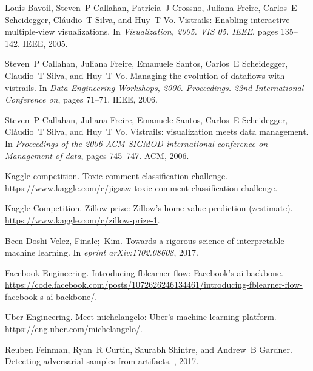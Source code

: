 \documentclass[11pt]{article}
\begin{document}
\begin{thebibliography}{10} 
\itemsep=1pt 
\begin{small}
Louis Bavoil, Steven~P Callahan, Patricia~J Crossno, Juliana Freire, Carlos~E
  Scheidegger, Cl{\'a}udio~T Silva, and Huy~T Vo.
\newblock Vistrails: Enabling interactive multiple-view visualizations.
\newblock In {\em Visualization, 2005. VIS 05. IEEE}, pages 135--142. IEEE,
  2005.

Steven~P Callahan, Juliana Freire, Emanuele Santos, Carlos~E Scheidegger,
  Claudio~T Silva, and Huy~T Vo.
\newblock Managing the evolution of dataflows with vistrails.
\newblock In {\em Data Engineering Workshops, 2006. Proceedings. 22nd
  International Conference on}, pages 71--71. IEEE, 2006.

Steven~P Callahan, Juliana Freire, Emanuele Santos, Carlos~E Scheidegger,
  Cl{\'a}udio~T Silva, and Huy~T Vo.
\newblock Vistrails: visualization meets data management.
\newblock In {\em Proceedings of the 2006 ACM SIGMOD international conference
  on Management of data}, pages 745--747. ACM, 2006.

Kaggle competition.
\newblock Toxic comment classification challenge.
\newblock
  \url{https://www.kaggle.com/c/jigsaw-toxic-comment-classification-challenge}.

Kaggle Competition.
\newblock Zillow prize: Zillow’s home value prediction (zestimate).
\newblock \url{https://www.kaggle.com/c/zillow-prize-1}.

Been Doshi-Velez, Finale;~Kim.
\newblock Towards a rigorous science of interpretable machine learning.
\newblock In {\em eprint arXiv:1702.08608}, 2017.

Facebook Engineering.
\newblock Introducing fblearner flow: Facebook's ai backbone.
\newblock
  \url{https://code.facebook.com/posts/1072626246134461/introducing-fblearner-flow-facebook-s-ai-backbone/}.

Uber Engineering.
\newblock Meet michelangelo: Uber's machine learning platform.
\newblock \url{https://eng.uber.com/michelangelo/}.

Reuben Feinman, Ryan~R Curtin, Saurabh Shintre, and Andrew~B Gardner.
\newblock Detecting adversarial samples from artifacts.
, 2017.


\end{small}
\end{thebibliography}
\end{document}
